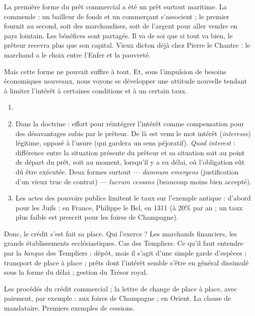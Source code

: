 \documentclass[french,twoside]{book} %
\begin{document}
\label{p95} La première forme du prêt commercial a été un prêt surtout maritime. La commende : un bailleur de fonds et un commerçant s’associent ; le premier fournit au second, soit des marchandises, soit de l’argent pour aller vendre en pays lointain. Les bénéfices sont partagés. Il va de soi que si tout va bien, le prêteur recevra plus que son capital. Vieux dicton déjà chez Pierre le Chantre : le marchand a le choix entre l’Enfer et la pauvreté.\par
Mais cette forme ne pouvait suffire à tout. Et, sous l’impulsion de besoins économiques nouveaux, nous voyons se développer une attitude nouvelle tendant à limiter l’intérêt à certaines conditions et à un certain taux.\par

\begin{enumerate}[itemsep=0pt,]
\item[] \hspace{-1.5em}{\bfseries Double :}
\item Dans la doctrine : effort pour réintégrer l’intérêt comme compensation pour des désavantages subis par le prêteur. De là est venu le mot intérêt ({\itshape interesse}) légitime, opposé à l’usure (qui gardera un sens péjoratif). {\itshape Quod interest} : différence entre la situation présente du prêteur et sa situation soit au point de départ du prêt, soit au moment, lorsqu’il y a eu délai, où l’obligation eût dû être exécutée. Deux formes surtout — {\itshape damnum emergens} (justification d’un vieux truc de contrat) — {\itshape lucrum cessans} (beaucoup moins bien accepté).
\item Les actes des pouvoirs publics limitent le taux sur l’exemple antique : d’abord pour les Juifs ; en France, Philippe le Bel, en 1311 (à 20\% par an ; un taux plus faible est prescrit pour les foires de Champagne).

\end{enumerate}\noindent Donc, le crédit s’est fait sa place. Qui l’exerce ? Les marchands financiers, les grands établissements ecclésiastiques. Cas des Templiers. Ce qu’il faut entendre par la \emph{banque} des Templiers : dépôt, mais il s’agit d’une simple garde d’espèces ; transport de place à place ; prêts dont l’intérêt semble s’être en général dissimulé sous la forme du délai ; gestion du Trésor royal.\par
Les procédés du crédit commercial ; la lettre de change de place à place, avec paiement, par exemple : aux foires de Champagne ; en Orient. La clause de mandataire. Premiers exemples de cessions.
\end{document}
